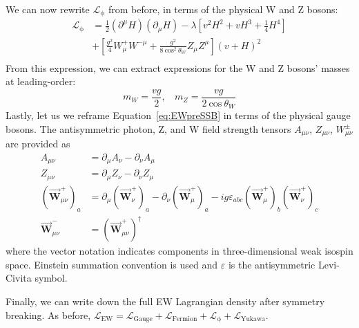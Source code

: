 We can now rewrite $\mathcal{L}_\mathrm{\phi}$ from before, in terms of the physical W and Z bosons:
\begin{equation}
\label{eq:LhiggsWZ}
\begin{split}
\mathcal{L}_\mathrm{\phi} & = \frac{1}{2} (\partial^\mu H) (\partial_\mu H) - \lambda\left[ v^2H^2 + vH^3 + \frac{1}{4}H^4\right] \\
& + \left[ \frac{g^2}{4} W^+_\mu W^{{-}\mu}  + \frac{g^2}{8\:\mathrm{cos}^2\:\theta_W} Z_\mu Z^\mu \right](v+H)^2   \\
\end{split}
\end{equation}
From this expression, we can extract expressions for the W and Z bosons' masses at leading-order:
\begin{equation}
\label{eq:WZmass}
m_W = \frac{v g}{2},\:\:\:\:m_Z = \frac{vg}{2\:\mathrm{cos}\:\theta_W}
\end{equation}
Lastly, let us we reframe Equation~\ref{eq:EWpreSSB} in terms of the physical gauge bosons.
The antisymmetric photon, Z, and W field strength tensors $A_{\mu\nu}$, $Z_{\mu\nu}$, $W^{\pm}_{\mu\nu}$ are provided as
\begin{equation}
\begin{split}
A_{\mu\nu} &= \partial_\mu A_\nu - \partial_\nu A_\mu \\
Z_{\mu\nu} &= \partial_\mu Z_\nu - \partial_\nu Z_\mu \\
(\vec{\mathbf{W}}^{+}_{\mu\nu})_a &= \partial_\mu (\vec{\mathbf{W}}^{+}_\nu)_a - \partial_\nu (\vec{\mathbf{W}}^{+}_\mu)_a - ig\varepsilon_{abc}(\vec{\mathbf{W}}^{+}_\mu)_b (\vec{\mathbf{W}}^{+}_\nu)_c \\
\vec{\mathbf{W}}^{-}_{\mu\nu} &= (\vec{\mathbf{W}}^{+}_{\mu\nu})^\dagger
\end{split}
\end{equation}
where the vector notation indicates components in three-dimensional weak isospin space.
Einstein summation convention is used and $\varepsilon$ is the antisymmetric Levi-Civita symbol.


Finally, we can write down the full EW Lagrangian density after symmetry breaking. 
As before, $\mathcal{L}_\mathrm{EW} = \mathcal{L}_\mathrm{Gauge} + \mathcal{L}_\mathrm{Fermion} + \mathcal{L}_\mathrm{\phi} + \mathcal{L}_\mathrm{Yukawa}$. 

